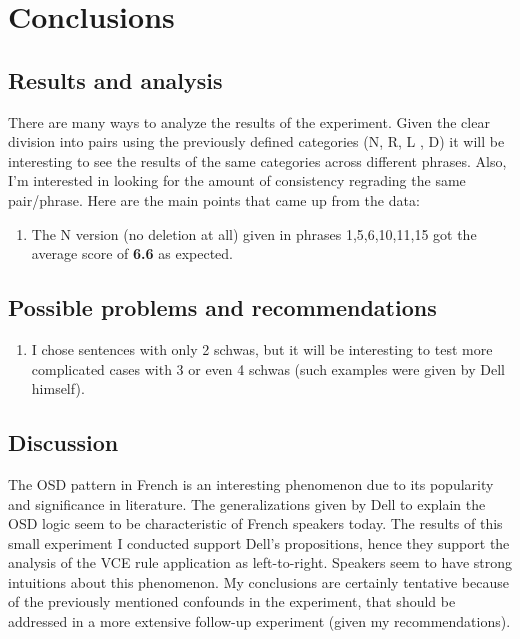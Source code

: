 \documentclass{article}
\begin{document}
\clearpage
\section{Conclusions}

\subsection{Results and analysis}
There are many ways to analyze the results of the experiment. Given the clear division into pairs using the previously defined categories (N, R, L , D) it will be interesting to see the results of the same categories across different phrases.  Also,  I'm interested in looking for the amount of consistency regrading the same pair/phrase.  Here are the main points that came up from the data:
\begin{enumerate}
  \item The N version (no deletion at all) given in phrases 1,5,6,10,11,15 got the average score of \textbf{6.6} as expected.
\end{enumerate}

\subsection{Possible problems and recommendations}
\begin{enumerate}
  \item I chose sentences with only 2 schwas, but it will be interesting to test more complicated cases with 3 or even 4 schwas (such examples were given by Dell himself).
\end{enumerate}

\subsection{Discussion}
The OSD pattern in French is an interesting phenomenon due to its popularity and significance in literature. The generalizations given by Dell to explain the OSD logic seem to be characteristic of French speakers today. The results of this small experiment I conducted support Dell's propositions, hence they support the analysis of the VCE rule application as left-to-right. Speakers seem to have strong intuitions about this phenomenon.
My conclusions are certainly tentative because of the previously mentioned confounds in the experiment,  that should be addressed in a more extensive follow-up experiment (given my recommendations).
\end{document}
